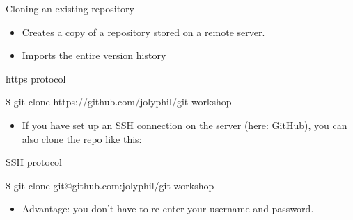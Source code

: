 \documentclass[handout]{beamer}
\begin{document}
\begin{frame}{Cloning an existing repository}
	\begin{itemize}
		\item Creates a copy of a repository stored on a remote server. 
		\item Imports the entire version history
	\end{itemize}
	\begin{exampleblock}{https protocol}
		\begin{semiverbatim}
			\item \$ git clone https://github.com/jolyphil/git-workshop
		\end{semiverbatim}
	\end{exampleblock}
	\begin{itemize}
		\item If you have set up an SSH connection on the server (here: GitHub), you can also clone the repo like this: 
	\end{itemize}
	\begin{exampleblock}{SSH protocol}
		\begin{semiverbatim}
			\item \$ git clone git@github.com:jolyphil/git-workshop
		\end{semiverbatim}
	\end{exampleblock}
	\begin{itemize}
		\item Advantage: you don't have to re-enter your username and password. 
	\end{itemize}
\end{frame}
\end{document}
